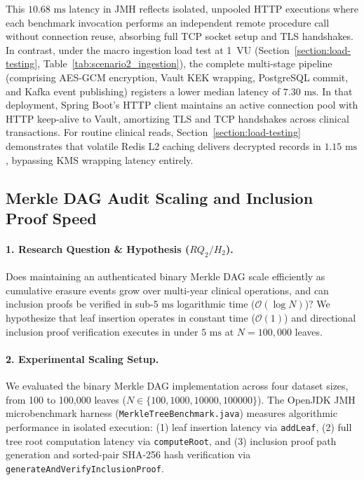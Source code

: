 This $10.68\text{~ms}$ latency in JMH reflects isolated, unpooled HTTP executions where each benchmark invocation performs an independent remote procedure call without connection reuse, absorbing full TCP socket setup and TLS handshakes. In contrast, under the macro ingestion load test at 1~VU (Section~\ref{section:load-testing}, Table~\ref{tab:scenario2_ingestion}), the complete multi-stage pipeline (comprising AES-GCM encryption, Vault KEK wrapping, PostgreSQL commit, and Kafka event publishing) registers a lower median latency of $7.30\text{~ms}$. In that deployment, Spring Boot's HTTP client maintains an active connection pool with HTTP keep-alive to Vault, amortizing TLS and TCP handshakes across clinical transactions. For routine clinical reads, Section~\ref{section:load-testing} demonstrates that volatile Redis L2 caching delivers decrypted records in $1.15\text{~ms}$, bypassing KMS wrapping latency entirely.

\subsection{Merkle DAG Audit Scaling and Inclusion Proof Speed}

\paragraph{1. Research Question \& Hypothesis ($RQ_2 / H_2$).}
Does maintaining an authenticated binary Merkle DAG scale efficiently as cumulative erasure events grow over multi-year clinical operations, and can inclusion proofs be verified in sub-$5\text{~ms}$ logarithmic time ($\mathcal{O}(\log N)$)? We hypothesize that leaf insertion operates in constant time ($\mathcal{O}(1)$) and directional inclusion proof verification executes in under $5\text{~ms}$ at $N = 100{,}000$ leaves.

\paragraph{2. Experimental Scaling Setup.}
We evaluated the binary Merkle DAG implementation across four dataset sizes, from 100 to 100,000 leaves ($N \in \{100, 1000, 10000, 100000\}$). The OpenJDK JMH microbenchmark harness (\texttt{MerkleTreeBenchmark.java}) measures algorithmic performance in isolated execution: (1) leaf insertion latency via \texttt{addLeaf}, (2) full tree root computation latency via \texttt{computeRoot}, and (3) inclusion proof path generation and sorted-pair SHA-256 hash verification via \texttt{generateAndVerifyInclusionProof}.

